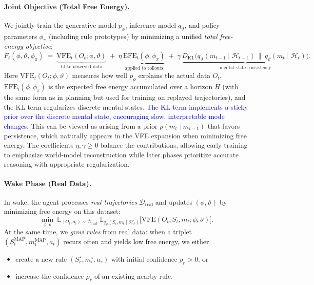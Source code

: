 \documentclass{article} %
\newcommand{\revise}[1]{\textcolor{blue}{#1}}
\begin{document}
\paragraph{Joint Objective (Total Free Energy).}
We jointly train the generative model $p_\phi$, inference model $q_\vartheta$, and policy parameters $\phi_\pi$ 
(including rule prototypes) by minimizing a unified \emph{total free-energy objective}:
{\small\begin{equation}
\label{eq:total_objective}
F_t(\phi,\vartheta,\phi_\pi)
\;=\;
\underbrace{\text{VFE}_t(O_t;\phi,\vartheta)}_{\text{fit to observed data}}
\;+\; \eta\,\underbrace{\text{EFE}_t(\phi,\phi_\pi)}_{\text{applied to rollouts}}
\;+\; \gamma\,\underbrace{D_{\mathrm{KL}}\!\big(q_\vartheta(m_{t-1}\mid\mathcal H_{t-1})\,\|\,q_\vartheta(m_t\mid\mathcal H_t)\big)}_{\text{mental-state consistency}}.
\end{equation}}
Here $\text{VFE}_t(O_t;\phi,\vartheta)$ measures how well $p_\phi$ explains the actual data $O_t$, 
$\text{EFE}_t(\phi,\phi_\pi)$ is the expected free energy accumulated over a horizon $H$ (with the same form as in planning but used for training on replayed trajectories), 
and the KL term regularizes discrete mental states. \revise{The KL term implements a sticky prior over the discrete mental state, encouraging slow, interpretable mode changes.} This can be viewed as arising from a prior $p(m_t \mid m_{t-1})$ that favors persistence, which naturally appears in the VFE expansion when minimizing free energy. The coefficients $\eta,\gamma \ge 0$ balance the contributions, allowing early training to emphasize world-model reconstruction while later phases prioritize accurate reasoning with appropriate regularization. 

\paragraph{Wake Phase (Real Data).}
In wake, the agent processes \emph{real trajectories} $\mathcal D_{\mathrm{real}}$ and updates 
$(\phi,\vartheta)$ by minimizing free energy on this dataset:
{\small\[
\min_{\phi,\vartheta}\; 
\mathbb{E}_{(O_t,a_t)\sim \mathcal D_{\mathrm{real}}}\;
\mathbb{E}_{q_\vartheta(S_t,m_t\mid \mathcal H_t)}
\big[\text{VFE}(O_t,S_t,m_t;\phi,\vartheta)\big].
\]}
At the same time, we \emph{grow rules} from real data: when a triplet 
$(S_t^{\mathrm{MAP}}, m_t^{\mathrm{MAP}}, a_t)$ recurs often and yields low free energy, we either  
\begin{itemize}
\item[(i)] create a new rule $(S_r^\star, m_r^\star, a_r)$ with initial confidence $\rho_r>0$, or  
\item[(ii)] increase the confidence $\rho_r$ of an existing nearby rule.  
\end{itemize}
\end{document}
